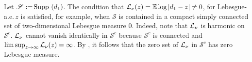 \documentclass{amsart}
\numberwithin{equation}{section}
\def\corAB{}
\begin{document}
 \begin{remark}
   \label{rem-simon}
  Let $\corAB{\mathscr{S}:=} \, \supp(d_1)$.
   The condition that $\corAB{\LL_\nu(z) }= \Exp\log|d_1 - z|\neq 0$, for
   Lebesgue-a.e.\,$z$ is satisfied, for example, when  \corAB{$\mathscr{S}$}
   is contained in a compact simply connected set of \corAB{two-dimensional Lebesgue} measure $0$.  Indeed, note that $\corAB{\LL_\nu}$ is harmonic on \corAB{$\mathscr{S}^c$}.
\corAB{$\mathcal{L}_\nu$} cannot vanish identically in \corAB{$\mathscr{S}^c$} because \corAB{$\mathscr{S}^c$} is connected and
$\limsup_{z\to\infty}\corAB{\LL_\nu(z)} = \infty$. By \cite[Theorem 3.1.18]{Simon}, it
follows that the zero set of \corAB{$\mathcal{L}_\nu$} in \corAB{$\mathscr{S}^c$} has \corAB{zero} Lebesgue measure.
%
 \end{remark}
\end{document}
